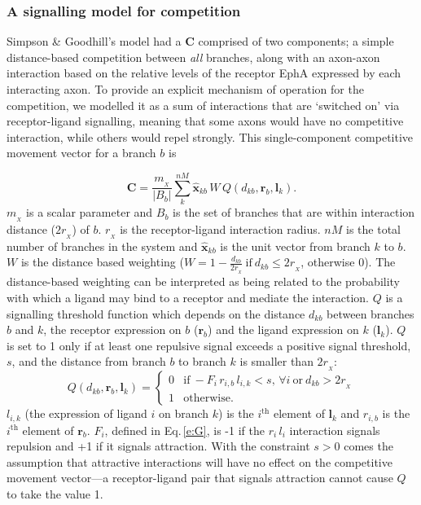 \documentclass[9pt]{elife} %
\begin{document}
\subsubsection*{A signalling model for competition}

Simpson \& Goodhill's model had a $\mathbf{C}$ comprised of two components; a simple distance-based competition between \emph{all} branches, along with an axon-axon interaction based on the relative levels of the receptor EphA expressed by each interacting axon.
To provide an explicit mechanism of operation for the competition, we modelled it as a sum of interactions that are `switched on' via receptor-ligand signalling, meaning that some axons would have no competitive interaction, while others would repel strongly.
This single-component competitive movement vector for a branch $b$ is

\begin{equation} \label{e:X}
\mathbf{C} = \frac{m_{\!_X}}{|B_{b}|} \sum_k^{nM} \hat{\mathbf{x}}_{kb}\,W\,Q(d_{kb}, \mathbf{r}_{b}, \mathbf{l}_{k}).
\end{equation}
%
$m_{\!_X}$ is a scalar parameter and $B_{b}$ is the set of branches that are within interaction distance ($2 r_{\!_X}$) of $b$. $r_{\!_X}$ is the receptor-ligand interaction radius. $nM$ is the total number of branches in the system and $\hat{\mathbf{x}}_{kb}$ is the unit vector from branch $k$ to $b$.
%
$W$ is the distance based weighting ($W = 1-\frac{d_{kb}}{2r_{\!_X}}~\mathrm{if}~  d_{kb}\leq 2r_{\!_X}$, otherwise $0$).
%
The distance-based weighting can be interpreted as being related to the probability with which a ligand may bind to a receptor and mediate the interaction.
%
$Q$ is a signalling threshold function which depends on the distance $d_{kb}$ between branches $b$ and $k$, the receptor expression on $b$ ($\mathbf{r}_b$) and the ligand expression on $k$ ($\mathbf{l}_k$).
$Q$ is set to 1 only if at least one repulsive signal exceeds a positive signal threshold, $s$, and the distance from branch $b$ to branch $k$ is smaller than $2 r_{\!_X}$:
%
\begin{equation}
Q(d_{kb}, \mathbf{r}_{b}, \mathbf{l}_{k}) = \begin{cases}
                 0 & \mathrm{if}~-F_i\,r_{i,b}\,l_{i,k} <
                 s,\,\forall{i}~\mathrm{or}~d_{kb} > 2r_{\!_X} \\
                 1 & \mathrm{otherwise.}
     \end{cases}
\end{equation}
%
$l_{i,k}$ (the expression of ligand $i$ on branch $k$) is the $i^{\mathrm{th}}$ element of $\mathbf{l}_k$ and $r_{i,b}$ is the $i^{\mathrm{th}}$ element of $\mathbf{r}_b$.
$F_i$, defined in Eq.\,\ref{e:G}, is -1 if the $r_{i}\,l_{i}$ interaction signals repulsion and +1 if it signals attraction.
With the constraint $s>0$ comes the assumption that attractive interactions will have no effect on the competitive movement vector---a receptor-ligand pair that signals attraction cannot cause $Q$ to take the value 1.
\end{document}
